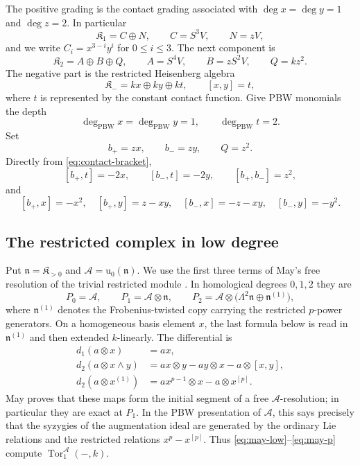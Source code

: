\documentclass[11pt]{article}
\theoremstyle{plain}
\theoremstyle{definition}
\theoremstyle{remark}
\numberwithin{equation}{section}
\newcommand{\kk}{k}
\newcommand{\Kalg}{\mathfrak K}
\newcommand{\Tor}{\operatorname{Tor}}
\newcommand{\uenv}{\mathrm u}
\begin{document}
The positive grading is the contact grading associated with $\deg x=\deg y=1$ and
$\deg z=2$.  In particular
\[
 \Kalg_1=C\oplus N,
 \qquad C=S^3V,
 \qquad N=zV,
\]
and we write $C_i=x^{3-i}y^i$ for $0\le i\le3$. The next component is
\[
 \Kalg_2=A\oplus B\oplus Q,
 \qquad A=S^4V,
 \qquad B=zS^2V,
 \qquad Q=\kk z^2.
\]
The negative part is the restricted Heisenberg algebra
\[
 \Kalg_-=\kk x\oplus\kk y\oplus\kk t,
 \qquad [x,y]=t,
\]
where $t$ is represented by the constant contact function.  Give PBW monomials the depth
\[
 \deg_{\mathrm{PBW}}x=\deg_{\mathrm{PBW}}y=1,
 \qquad
 \deg_{\mathrm{PBW}}t=2.
\]
Set
\[
 b_+=zx,
 \qquad b_-=zy,
 \qquad Q=z^2.
\]
Directly from \eqref{eq:contact-bracket},
\begin{equation}\label{eq:basic-contact}
 {[b_+,t]}=-2x,
 \qquad
 {[b_-,t]}=-2y,
 \qquad
 {[b_+,b_-]}=z^2,
\end{equation}
and
\begin{equation}\label{eq:basic-horizontal}
 {[b_+,x]}=-x^2,
 \quad [b_+,y]=z-xy,
 \quad [b_-,x]=-z-xy,
 \quad [b_-,y]=-y^2.
\end{equation}

\subsection{The restricted complex in low degree}\label{sec:restricted-complex}

Put $\mathfrak n=\Kalg_{>0}$ and $\mathcal A=\uenv_0(\mathfrak n)$.  We use the first three
terms of May's free resolution of the trivial restricted module \cite{May}.
In homological degrees $0,1,2$ they are
\begin{equation}\label{eq:may-low}
 P_0=\mathcal A,
 \qquad
 P_1=\mathcal A\otimes\mathfrak n,
 \qquad
 P_2=\mathcal A\otimes\bigl(\Lambda^2\mathfrak n\oplus\mathfrak n^{(1)}\bigr),
\end{equation}
where $\mathfrak n^{(1)}$ denotes the Frobenius-twisted copy carrying the restricted
$p$-power generators.  On a homogeneous basis element $x$, the last formula below is read
in $\mathfrak n^{(1)}$ and then extended $\kk$-linearly.  The differential is
\begin{align}
 d_1(a\otimes x)&=ax,\label{eq:may-d1}\\
 d_2(a\otimes x\wedge y)
 &=ax\otimes y-ay\otimes x-a\otimes[x,y],\label{eq:may-lie}\\
 d_2(a\otimes x^{(1)})
 &=ax^{p-1}\otimes x-a\otimes x^{[p]}.\label{eq:may-p}
\end{align}
May proves that these maps form the initial segment of a free $\mathcal A$-resolution; in
particular they are exact at $P_1$.  In the PBW presentation of $\mathcal A$, this says precisely
that the syzygies of the augmentation ideal are generated by the ordinary Lie relations
and the restricted relations $x^p-x^{[p]}$.  Thus
\eqref{eq:may-low}--\eqref{eq:may-p} compute $\Tor^{\mathcal A}_1(-,\kk)$.
\end{document}
